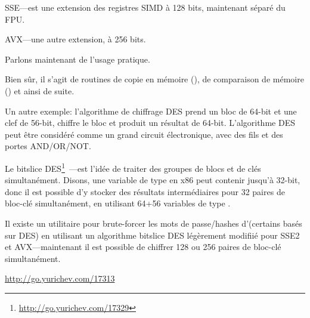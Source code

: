 SSE---est une extension des registres SIMD à 128 bits, maintenant séparé du FPU.

AVX---une autre extension, à 256 bits.

Parlons maintenant de l'usage pratique.

Bien sûr, il s'agit de routines de copie en mémoire (), de comparaison
de mémoire () et ainsi de suite.


Un autre exemple: l'algorithme de chiffrage DES prend un bloc de 64-bit et une clef
de 56-bit, chiffre le bloc et produit un résultat de 64-bit.
L'algorithme DES peut être considéré comme un grand circuit électronique, avec des
fils et des portes AND/OR/NOT.

\label{bitslicedes}
\newcommand{\URLBS}{\url{http://go.yurichev.com/17329}}

Le bitslice DES\footnote{\URLBS}~---est l'idée de traiter des groupes de blocs et
de clés simultanément.
Disons, une variable de type  en x86 peut contenir jusqu'à 32-bit,
donc il est possible d'y stocker des résultats intermédiaires pour 32 paires de bloc-clé
simultanément, en utilisant 64+56 variables de type .

\myindex{\oracle}
Il existe un utilitaire pour brute-forcer les mots de passe/hashes d'\oracle (certains
basés sur DES) en utilisant un algorithme bitslice DES légèrement modifiié pour SSE2
et AVX---maintenant il est possible de chiffrer 128 ou 256 paires de bloc-clé simultanément.

\url{http://go.yurichev.com/17313}



